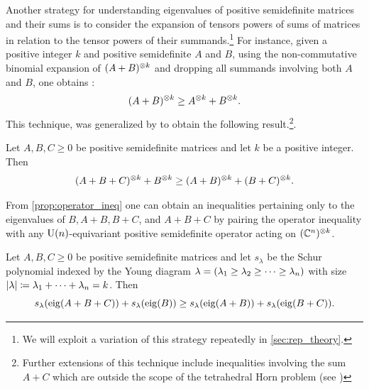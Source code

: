 \documentclass[notitlepage, 10pt]{article}
\begin{document}
Another strategy for understanding eigenvalues of positive semidefinite matrices and their sums is to consider the expansion of tensors powers of sums of matrices in relation to the tensor powers of their summands.\footnote{We will exploit a variation of this strategy repeatedly in \cref{sec:rep_theory}.}
For instance, given a positive integer $k$ and positive semidefinite $A$ and $B$, using the non-commutative binomial expansion of $(A+B)^{\otimes k}$ and dropping all summands involving both $A$ and $B$, one obtains \cite[Proposition 1.1]{berndt2015hlawka}:
\begin{equation}
    (A+B)^{\otimes k} \geq A^{\otimes k} + B^{\otimes k}.
\end{equation}
This technique, was generalized by \cite{tie2011rearrangement} \cite[Lemma 2.2]{tie2011rearrangement} to obtain the following result.\footnote{Further extensions of this technique include inequalities involving the sum $A+C$ which are outside the scope of the tetrahedral Horn problem (see \cite{lin2014determinantal,berndt2015hlawka,niculescu2023functions})}.
\begin{prop}
    \label{prop:operator_ineq}
    Let $A,B,C \geq 0$ be positive semidefinite matrices and let $k$ be a positive integer.
    Then
    \begin{equation}
        (A+B+C)^{\otimes k} + B^{\otimes k} \geq (A+B)^{\otimes k} + (B+C)^{\otimes k}.
    \end{equation}
\end{prop}
From \cref{prop:operator_ineq} one can obtain an inequalities pertaining only to the eigenvalues of $B, A+B, B+C$, and $A+B+C$ by pairing the operator inequality with any $\operatorname{U}(n)$-equivariant positive semidefinite operator acting on $(\mathbb C^{n})^{\otimes k}$.\footnotemark{}
\begin{cor}
    \label{cor:schur_ineq}
    Let $A,B,C \geq 0$ be positive semidefinite matrices and let $s_{\lambda}$ be the Schur polynomial indexed by the Young diagram $\lambda = (\lambda_1 \geq \lambda_2 \geq \cdots \geq \lambda_n)$ with size ${|\lambda|} \coloneqq \lambda_1 + \cdots + \lambda_n = k$.
    Then
    \begin{equation}
        \label{eq:schur_ineq}
        s_{\lambda}(\operatorname{eig}(A+B+C)) + s_{\lambda}(\operatorname{eig}(B)) \geq s_{\lambda}(\operatorname{eig}(A+B)) + s_{\lambda}(\operatorname{eig}(B+C)).
    \end{equation}
\end{cor}
\end{document}
